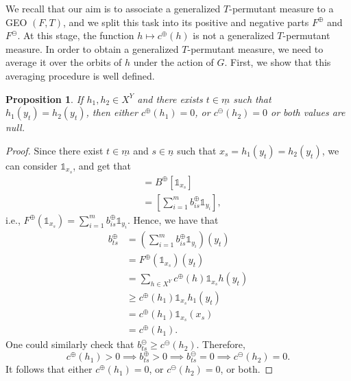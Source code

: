 \documentclass[11pt]{article}
\newcommand{\pat}[1]{\todo[author=Patrizio]{#1}}
\newtheorem{proposition}[theorem]{Proposition}
\begin{document}
We recall that our aim is to associate a generalized $T$-permutant measure to a
GEO $(F,T)$, and we split this task into its positive and negative parts
$F^\oplus$ and $F^\ominus$. At this stage, the function $h \mapsto c^\oplus(h)$
is not a generalized $T$-permutant measure. In order to obtain a generalized
$T$-permutant measure, we need to average it over the orbits of $h$ under the
action of $G$. First, we show that this averaging procedure is well defined.


\begin{proposition}\label{propc}
If $h_1, h_2 \in X^Y$ and there exists $t \in \underline{m}$ such that $h_1(y_t) = h_2(y_t)$, then either $c^\oplus(h_1)=0$, or $c^\ominus(h_2)=0$ or both values are null.
\end{proposition}

\begin{proof}
    Since there exist $t \in \underline{m}$ {\color{black} and $s\in\underline{n}$} such that $x_s=h_1(y_t) = h_2(y_t)$, we can consider $\mathds{1}_{x_s}$, and get that
    \begin{align*}
        [F^\oplus \left( \mathds{1}_{x_s} \right)] & = B^\oplus [\mathds{1}_{x_s}] \\
        & = \left[\sum_{i = 1}^m b^\oplus_{is}\mathds{1}_{y_i}\right],
    \end{align*}
    {\color{black} i.e., $F^\oplus \left( \mathds{1}_{x_s} \right)=\sum_{i = 1}^m b^\oplus_{is}\mathds{1}_{y_i}$.}
    Hence, we have that
\begin{align*}
        b^\oplus_{ts} & = \left( \sum_{i = 1}^m b^\oplus_{is}\mathds{1}_{y_i}\right)(y_t)
        \\ & = F^\oplus \left( \mathds{1}_{x_s} \right)(y_t)
        \\& = \sum_{h \in X^Y}c^\oplus(h) \mathds{1}_{x_s}h(y_t)
        \\ & \ge c^\oplus(h_1) \mathds{1}_{x_s}h_1(y_t)
        \\ & = c^\oplus(h_1) \mathds{1}_{x_s}(x_s)
        \\ & = c^\oplus(h_1).
    \end{align*}
    One could similarly check that $b^\ominus_{ts} \ge c^\ominus({h_2})$. Therefore,
    \[
    c^\oplus({h_1})>0 \implies b^\oplus_{ts}>0 \implies b^\ominus_{ts}=0 \implies c^\ominus({h_2})=0.
    \]
    It follows that either $c^\oplus(h_1)=0$, or $c^\ominus(h_2)=0$, or both.
\end{proof}
\end{document}
